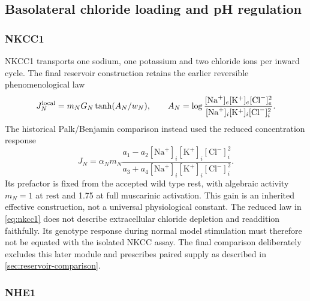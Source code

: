 \documentclass[11pt]{article}
\newcommand{\Na}{\mathrm{Na}^{+}}
\newcommand{\K}{\mathrm{K}^{+}}
\newcommand{\Cl}{\mathrm{Cl}^{-}}
\begin{document}
\subsection{Basolateral chloride loading and pH regulation}

\subsubsection{NKCC1}

NKCC1 transports one sodium, one potassium and two chloride ions per inward cycle. The final reservoir construction retains the earlier reversible phenomenological law
\begin{equation}
 J_N^{\rm local}=m_N G_N\tanh(A_N/w_N),\qquad
 A_N=\log\frac{[\Na]_e[\K]_e[\Cl]_e^2}{[\Na]_i[\K]_i[\Cl]_i^2}.
 \label{eq:nkcc-prepalk}
\end{equation}
The historical Palk/Benjamin comparison instead used the reduced concentration response \citep{Benjamin1997,Palk2010}
\begin{equation}
 J_N=\alpha_N m_N
 \frac{a_1-a_2[\Na]_i[\K]_i[\Cl]_i^2}
      {a_3+a_4[\Na]_i[\K]_i[\Cl]_i^2}.
 \label{eq:nkcc1}
\end{equation}
Its prefactor is fixed from the accepted wild type rest, with algebraic activity $m_N=1$ at rest and 1.75 at full muscarinic activation. This gain is an inherited effective construction, not a universal physiological constant. The reduced law in \cref{eq:nkcc1} does not describe extracellular chloride depletion and readdition faithfully. Its genotype response during normal model stimulation must therefore not be equated with the isolated NKCC assay. The final comparison deliberately excludes this later module and prescribes paired supply as described in \cref{sec:reservoir-comparison}.

\subsubsection{NHE1}
\end{document}
